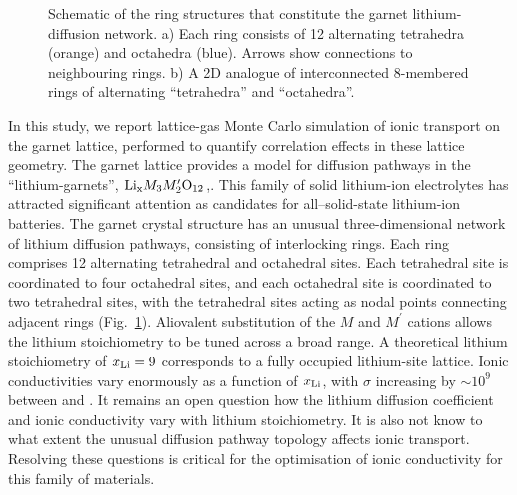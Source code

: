 \documentclass[aps,prb,twocolumn,superscriptaddress,reprint]{revtex4-1}
\newcommand{\xLi}{x_\m{Li}}
\begin{document}
\begin{figure}[tb]
  \centering
    \caption{\label{fig:garnet_network_schematic}Schematic of the ring structures that constitute the garnet lithium-diffusion network. a) Each ring consists of 12 alternating tetrahedra (orange) and octahedra (blue). 
Arrows show connections to neighbouring rings.\cite{AwakaEtAl_ChemLett2011} b) A 2D analogue of interconnected 8-membered rings of alternating ``tetrahedra'' and ``octahedra''.}
\end{figure}

In this study, we report lattice-gas Monte Carlo simulation of ionic transport on the garnet lattice, performed to quantify correlation effects in these lattice geometry. The garnet lattice provides a model for diffusion pathways in the ``lithium-garnets'', $\mathrm{Li}_{\mathrm{x}}M_3M^\prime_2\mathrm{O}_{12}$,\cite{ThangaduraiEtAl_JAmCeramSoc2003, ThangaduraiEtAl_JPhysChemLett2015}. This family of solid lithium-ion electrolytes has attracted significant attention as candidates for all--solid-state lithium-ion batteries.\cite{BachmanEtAl_ChemRev2016, InadaEtAl_FrontEnergyRes2016,HanEtAl_NatMater2016, RamakumarEtAl_ProgMaterSci2017} The garnet crystal structure has an unusual three-dimensional network of lithium diffusion pathways, consisting of interlocking rings.\cite{AwakaEtAl_ChemLett2011} Each ring comprises 12 alternating tetrahedral and octahedral sites. Each tetrahedral site is coordinated to four octahedral sites, and each octahedral site is coordinated to two tetrahedral sites, with the tetrahedral sites acting as nodal points connecting adjacent rings (Fig.~\ref{fig:garnet_network_schematic}).
Aliovalent substitution of the $M$ and $M^\prime$ cations allows the lithium stoichiometry to be tuned across a broad range. 
A theoretical lithium stoichiometry of $\xLi=9$ corresponds to a fully occupied lithium-site lattice. 
Ionic conductivities vary enormously as a function of $\xLi$, with $\sigma$ increasing by $\sim\!10^9$ between  and .\cite{ThangaduraiEtAl_JPhysChemLett2015, BachmanEtAl_ChemRev2016} It remains an open question how the lithium diffusion coefficient and ionic conductivity vary with lithium stoichiometry. It is also not know to what extent the unusual diffusion pathway topology affects ionic transport. Resolving these questions is critical for the optimisation of ionic conductivity for this family of materials.
\end{document}
